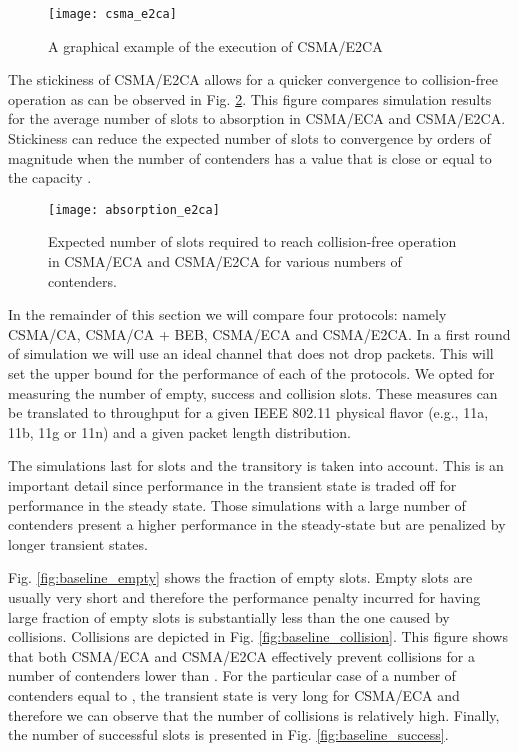 \documentclass[journal]{IEEEtran}
\begin{document}
\begin{figure}[!t]
\centering
\texttt{[image: csma\_e2ca]}
\caption{A graphical example of the execution of CSMA/E2CA}
\label{fig:csma_e2ca}
\end{figure}

The stickiness of CSMA/E2CA allows for a quicker convergence to collision-free operation as can be observed in Fig. \ref{fig:absorption_e2ca}. This figure compares simulation results for the average number of slots to absorption in CSMA/ECA and CSMA/E2CA. Stickiness can reduce the expected number of slots to convergence by orders of magnitude when the number of contenders  has a value that is close or equal to the capacity .

\begin{figure}[!t]
\centering
\texttt{[image: absorption\_e2ca]}
\caption{Expected number of slots required to reach collision-free operation in CSMA/ECA and CSMA/E2CA for various numbers of contenders.}
\label{fig:absorption_e2ca}
\end{figure}

In the remainder of this section we will compare four protocols: namely CSMA/CA, CSMA/CA + BEB, CSMA/ECA and CSMA/E2CA. In a first round of simulation we will use an ideal channel that does not drop packets. This will set the upper bound for the performance of each of the protocols. We opted for measuring the number of empty, success and collision slots. These measures can be translated to throughput for a given IEEE 802.11 physical flavor (e.g., 11a, 11b, 11g or 11n) and a given packet length distribution.

The simulations last for  slots and the transitory is taken into account. This is an important detail since performance in the transient state is traded off for performance in the steady state. Those simulations with a large number of contenders present a higher performance in the steady-state but are penalized by longer transient states.

Fig. \ref{fig:baseline_empty} shows the fraction of empty slots. Empty slots are usually very short and therefore the performance penalty incurred for having large fraction of empty slots is substantially less than the one caused by collisions. Collisions are depicted in Fig. \ref{fig:baseline_collision}. This figure shows that both CSMA/ECA and CSMA/E2CA effectively prevent collisions for a number of contenders lower than . For the particular case of a number of contenders equal to , the transient state is very long for CSMA/ECA and therefore we can observe that the number of collisions is relatively high. Finally, the number of successful slots is presented in Fig. \ref{fig:baseline_success}.
\end{document}
